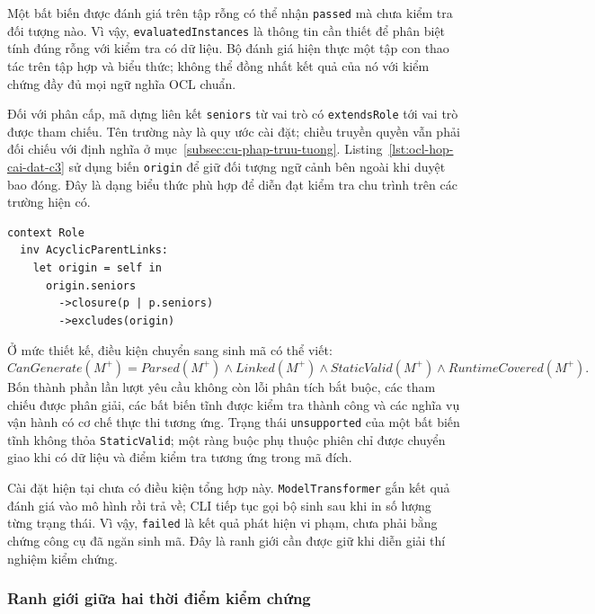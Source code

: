 Một bất biến được đánh giá trên tập rỗng có thể nhận \texttt{passed} mà chưa kiểm tra đối tượng nào. Vì vậy, \texttt{evaluatedInstances} là thông tin cần thiết để phân biệt tính đúng rỗng với kiểm tra có dữ liệu. Bộ đánh giá hiện thực một tập con thao tác trên tập hợp và biểu thức; không thể đồng nhất kết quả của nó với kiểm chứng đầy đủ mọi ngữ nghĩa OCL chuẩn.

Đối với phân cấp, mã dựng liên kết \texttt{seniors} từ vai trò có \texttt{extendsRole} tới vai trò được tham chiếu. Tên trường này là quy ước cài đặt; chiều truyền quyền vẫn phải đối chiếu với định nghĩa ở mục~\ref{subsec:cu-phap-truu-tuong}. Listing~\ref{lst:ocl-hop-cai-dat-c3} sử dụng biến \texttt{origin} để giữ đối tượng ngữ cảnh bên ngoài khi duyệt bao đóng. Đây là dạng biểu thức phù hợp để diễn đạt kiểm tra chu trình trên các trường hiện có.

\begin{lstlisting}[language=OCL,caption={Kiểm tra chu trình trên liên kết kế thừa của mô hình đánh giá hiện tại},label={lst:ocl-hop-cai-dat-c3}]
context Role
  inv AcyclicParentLinks:
    let origin = self in
      origin.seniors
        ->closure(p | p.seniors)
        ->excludes(origin)
\end{lstlisting}

Ở mức thiết kế, điều kiện chuyển sang sinh mã có thể viết:
\[
\mathit{CanGenerate}(M^{+}) =
\mathit{Parsed}(M^{+})
\land \mathit{Linked}(M^{+})
\land \mathit{StaticValid}(M^{+})
\land \mathit{RuntimeCovered}(M^{+}).
\]
Bốn thành phần lần lượt yêu cầu không còn lỗi phân tích bắt buộc, các tham chiếu được phân giải, các bất biến tĩnh được kiểm tra thành công và các nghĩa vụ vận hành có cơ chế thực thi tương ứng. Trạng thái \texttt{unsupported} của một bất biến tĩnh không thỏa \texttt{StaticValid}; một ràng buộc phụ thuộc phiên chỉ được chuyển giao khi có dữ liệu và điểm kiểm tra tương ứng trong mã đích.

Cài đặt hiện tại chưa có điều kiện tổng hợp này. \texttt{ModelTransformer} gắn kết quả đánh giá vào mô hình rồi trả về; CLI tiếp tục gọi bộ sinh sau khi in số lượng từng trạng thái. Vì vậy, \texttt{failed} là kết quả phát hiện vi phạm, chưa phải bằng chứng công cụ đã ngăn sinh mã. Đây là ranh giới cần được giữ khi diễn giải thí nghiệm kiểm chứng.

\subsubsection{Ranh giới giữa hai thời điểm kiểm chứng}

